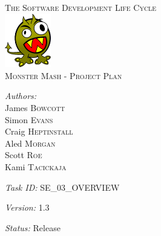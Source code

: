 \documentclass[a4paper]{article}
\begin{document}
\pagestyle{fancy}
\begin{center}
\textsc{\LARGE The Software Development Life Cycle}\\[1.5cm]
\includegraphics[width=0.15\textwidth]{img/monster.png}\\[1.5cm]    
\textsc{\Large Monster Mash - Project Plan}\\[0.5cm]

\begin{minipage}{0.8\textwidth}
\begin{flushleft} \large
\emph{Authors:}\\
James \textsc{Bowcott}\\
Simon \textsc{Evans}\\
Craig \textsc{Heptinstall}\\
Aled \textsc{Morgan}\\
Scott \textsc{Roe}\\
Kami \textsc{Tacickaja}\\
\end{flushleft}
\end{minipage}
\vspace{8 mm}

\begin{minipage}{0.8\textwidth}
\begin{flushleft} \large
\emph{Task ID:}
SE\_03\_OVERVIEW\\
\end{flushleft}
\end{minipage}
\vspace{8 mm}

\begin{minipage}{0.8\textwidth}
\begin{flushleft} \large
\emph{Version:}
1.3\\
\end{flushleft}
\end{minipage}
\vspace{8 mm}

\begin{minipage}{0.8\textwidth}
\begin{flushleft} \large
\emph{Status:}
Release\\
\end{flushleft}
\end{minipage}
\vspace{8 mm}


\end{center}
\end{document}
